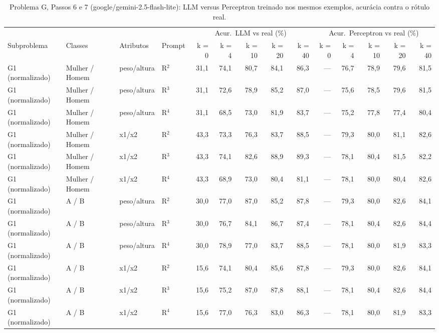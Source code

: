 \begin{table}[htbp]
\centering
\footnotesize
\caption{Problema G, Passos 6 e 7 (google/gemini-2.5-flash-lite): LLM versus Perceptron treinado nos mesmos exemplos, acurácia contra o rótulo real.}
\label{tab:bloco3_G_passo7_LLM_vs_perceptron_flashlite}
\begin{tabular}{llllrrrrrrrrrr}
\toprule
 &  &  &  & \multicolumn{5}{c}{Acur.\ LLM vs real (\%)} & \multicolumn{5}{c}{Acur.\ Perceptron vs real (\%)} \\ \cmidrule(lr){5-9} \cmidrule(lr){10-14}
Subproblema & Classes & Atributos & Prompt & k = 0 & k = 4 & k = 10 & k = 20 & k = 40 & k = 0 & k = 4 & k = 10 & k = 20 & k = 40 \\
\midrule
G1 (normalizado) & Mulher / Homem & peso/altura & R$^2$ & 31,1 & 74,1 & 80,7 & 84,1 & 86,3 & — & 76,7 & 78,9 & 79,6 & 81,5 \\
G1 (normalizado) & Mulher / Homem & peso/altura & R$^3$ & 31,1 & 72,6 & 78,9 & 85,2 & 87,0 & — & 75,6 & 78,5 & 79,6 & 81,5 \\
G1 (normalizado) & Mulher / Homem & peso/altura & R$^4$ & 31,1 & 68,5 & 73,0 & 81,9 & 83,7 & — & 75,2 & 77,8 & 77,4 & 80,4 \\
G1 (normalizado) & Mulher / Homem & x1/x2 & R$^2$ & 43,3 & 73,3 & 76,3 & 83,7 & 88,5 & — & 79,3 & 80,0 & 81,1 & 82,6 \\
G1 (normalizado) & Mulher / Homem & x1/x2 & R$^3$ & 43,3 & 74,1 & 82,6 & 88,9 & 89,3 & — & 78,1 & 80,4 & 81,5 & 82,2 \\
G1 (normalizado) & Mulher / Homem & x1/x2 & R$^4$ & 43,3 & 68,9 & 73,0 & 80,4 & 81,1 & — & 78,1 & 80,0 & 80,4 & 82,6 \\
G1 (normalizado) & A / B & peso/altura & R$^2$ & 30,0 & 77,0 & 87,0 & 85,2 & 87,8 & — & 79,3 & 80,0 & 82,6 & 84,1 \\
G1 (normalizado) & A / B & peso/altura & R$^3$ & 30,0 & 76,7 & 84,1 & 86,7 & 87,4 & — & 78,1 & 80,4 & 82,6 & 84,4 \\
G1 (normalizado) & A / B & peso/altura & R$^4$ & 30,0 & 78,9 & 77,0 & 83,7 & 88,5 & — & 78,1 & 80,0 & 81,9 & 83,3 \\
G1 (normalizado) & A / B & x1/x2 & R$^2$ & 15,6 & 74,1 & 80,4 & 85,6 & 87,8 & — & 79,3 & 80,0 & 82,6 & 84,1 \\
G1 (normalizado) & A / B & x1/x2 & R$^3$ & 15,6 & 75,2 & 87,0 & 87,8 & 88,1 & — & 78,1 & 80,4 & 82,6 & 84,4 \\
G1 (normalizado) & A / B & x1/x2 & R$^4$ & 15,6 & 77,0 & 76,3 & 83,0 & 86,3 & — & 78,1 & 80,0 & 81,9 & 83,3 \\

\end{tabular}
\end{table}
